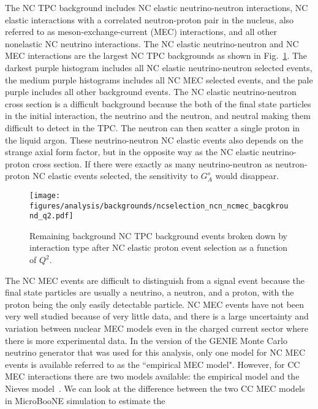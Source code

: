     The NC TPC background includes NC elastic neutrino-neutron interactions, NC
    elastic interactions with a correlated neutron-proton pair in the nucleus,
    also referred to as meson-exchange-current (MEC) interactions, and all
    other nonelastic NC neutrino interactions. The NC elastic neutrino-neutron
    and NC MEC interactions are the largest NC TPC backgrounds as shown in
    Fig.~\ref{fig:ncnmecbgs}. The darkest purple histogram includes all NC
    elastic neutrino-neutron selected events, the medium purple histograms
    includes all NC MEC selected events, and the pale purple includes all other
    background events. The NC elastic neutrino-neutron cross section is a
    difficult background because the both of the final state particles in the
    initial interaction, the neutrino and the neutron, and neutral making them
    difficult to detect in the TPC. The neutron can then scatter a single
    proton in the liquid argon. These neutrino-neutron NC elastic events also
    depends on the strange axial form factor, but in the opposite way as the NC
    elastic neutrino-proton cross section. If there were exactly as many
    neutrino-neutron as neutron-proton NC elastic events selected, the
    sensitivity to $G_A^s$ would disappear. 
    \begin{figure}[ht]
      \centering
      \texttt{[image: figures/analysis/backgrounds/ncselection\_ncn\_ncmec\_bacgkround\_q2.pdf]}
      \caption{Remaining background NC TPC background events broken down by
      interaction type after NC elastic proton event selection as a function of
      $Q^2$.}
      \label{fig:ncnmecbgs}
    \end{figure}
    The NC MEC events are difficult to distinguish from a signal event because
    the final state particles are usually a neutrino, a neutron, and a proton,
    with the proton being the only easily detectable particle. NC MEC events
    have not been very well studied because of very little data, and there is a
    large uncertainty and variation between nuclear MEC models even in the
    charged current sector where there is more experimental data. In the
    version of the GENIE Monte Carlo neutrino generator that was used for this
    analysis, only one model for NC MEC events is available referred to as the
    ``empirical MEC model". However, for CC MEC interactions there are two
    models available: the empirical model and the Nieves
    model~\cite{Nieves:2011pp,Nieves:2011yp}. We can look at the difference
    between the two CC MEC models in MicroBooNE simulation to estimate the
